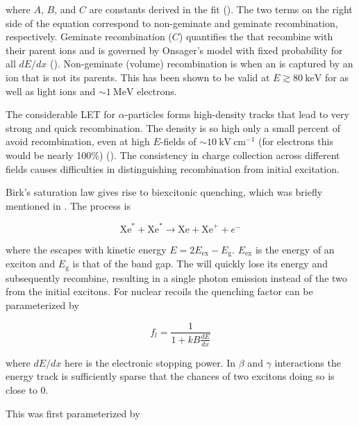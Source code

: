\noindent where $A$, $B$, and $C$ are constants derived in the fit ().  The two terms on the right side of the equation
correspond to
non-geminate and geminate recombination, respectively.  Geminate recombination ($C$) quantifies the
\electron that recombine with their parent ions and is governed by Onsager's model with fixed probability for all $dE/dx$
().  Non-geminate
(volume) recombination is when an \electron is captured by an ion that is not its parents.  This has been shown to be valid at
$E \gtrsim 80\ \mathrm{keV}$ for \gammarays as well as light ions and $\sim 1\ \mathrm{MeV}$ electrons.

The considerable LET for $\alpha$-particles forms high-density tracks that lead to very strong and quick recombination.  The
density is so high only a small percent of \electron avoid recombination, even at high $E$-fields of $\sim 10\ \mathrm{kV\ cm^{-1}}$
(for electrons this would be nearly 100\%) ().  The consistency in charge collection across different fields causes
difficulties in distinguishing recombination from initial excitation.

Birk's saturation law gives rise to biexcitonic quenching, which was briefly mentioned in .  The process is

\begin{equation}
\mathrm{Xe}^{*} + \mathrm{Xe}^{*} \rightarrow \mathrm{Xe} + \mathrm{Xe}^{+} + e^{-}
\label{eq:biexcitonic_again}
\end{equation}

\noindent where the \electron escapes with kinetic energy $E = 2E_{\mathrm{ex}} - E_{\mathrm{g}}$.  $E_{\mathrm{ex}}$ is the energy
of an exciton and $E_{\mathrm{g}}$ is that of the band gap.  The \electron will quickly lose its energy and subsequently recombine,
resulting in a single photon emission instead of the two from the initial excitons.  For nuclear recoils the quenching factor can
be parameterized by

\begin{equation}
f_{l} = \frac{1}{1 + kB \frac{dE}{dx}}
\label{eq:nr_scint_quench}
\end{equation}

\noindent where $dE/dx$ here is the electronic stopping power.  In $\beta$ and $\gamma$ interactions the energy track is
sufficiently sparse that the chances of two excitons doing so is close to 0.

This was first parameterized by



